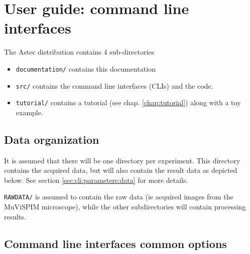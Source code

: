 \chapter{User guide: command line interfaces}
\label{chap:clis}

The Astec distribution contains 4 sub-directories

\mbox{}
\mbox{}

\begin{itemize}
\itemsep -0.5ex
\item \texttt{documentation/} contains this documentation
\item \texttt{src/} contains the command line interfaces (CLIs)  and the code.
\item \texttt{tutorial/} contains a tutorial (see chap. \ref{chap:tutorial}) along with a toy example.
\end{itemize}





%
%
%


\section{Data organization}

It is assumed that there will be one directory per experiment. This
directory contains the acquired data, but will also contain the result
data as depicted below. See section \ref{sec:cli:parameters:data} for more details.

\mbox{}
\mbox{}

\texttt{RAWDATA/} is assumed to contain the raw data (ie acquired
images from the MuViSPIM microscope), while the other subdirectories
will contain processing results.


\section{Command line interfaces common options}
\label{sec:cli:common}

